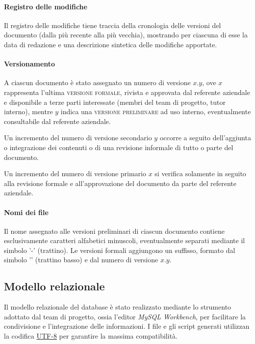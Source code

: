 \documentclass[11pt,a4paper,headsepline,hidelinks]{scrreprt} %
\begin{document}
	\paragraph{Registro delle modifiche}
	Il registro delle modifiche tiene traccia della cronologia delle versioni del documento (dalla più recente alla più vecchia), mostrando per ciascuna di esse la data di redazione e una descrizione sintetica delle modifiche apportate.

	\paragraph{Versionamento}
	A ciascun documento è stato assegnato un numero di versione $x.y$, ove $x$ rappresenta l'ultima \textsc{versione formale}, rivista e approvata dal referente aziendale e disponibile a terze parti interessate (membri del team di progetto, tutor interno), mentre $y$ indica una \textsc{versione preliminare} ad uso interno, eventualmente consultabile dal referente aziendale.

	Un incremento del numero di versione secondario $y$ occorre a seguito dell'aggiunta o integrazione dei contenuti o di una revisione informale di tutto o parte del documento.

	Un incremento del numero di versione primario $x$ si verifica solamente in seguito alla revisione formale e all'approvazione del documento da parte del referente aziendale.

	\paragraph{Nomi dei file}
	Il nome assegnato alle versioni preliminari di ciascun documento contiene esclusivamente caratteri alfabetici minuscoli, eventualmente separati mediante il simbolo '-' (trattino). Le versioni formali aggiungono un suffisso, formato dal simbolo '\textunderscore' (trattino basso) e dal numero di versione $x.y$.

	\subsection{Modello relazionale}
	Il modello relazionale del database è stato realizzato mediante lo strumento adottato dal team di progetto, ossia l'editor \textit{MySQL Workbench}, per facilitare la condivisione e l'integrazione delle informazioni. I file e gli script generati utilizzan la codifica \underline{UTF-8} per garantire la massima compatibilità.
	
\end{document}
